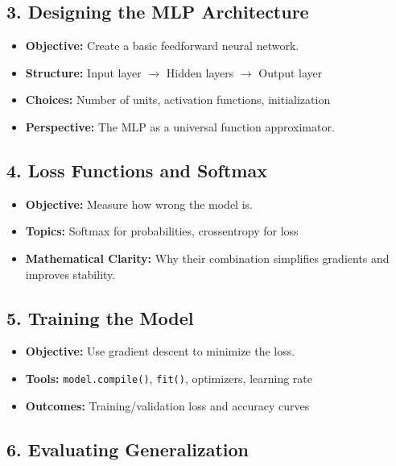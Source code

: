 \documentclass[11pt]{article}
\begin{document}
\subsection*{3. Designing the MLP Architecture}

\begin{itemize}
    \item \textbf{Objective:} Create a basic feedforward neural network.
    \item \textbf{Structure:} Input layer $\rightarrow$ Hidden layers $\rightarrow$ Output layer
    \item \textbf{Choices:} Number of units, activation functions, initialization
    \item \textbf{Perspective:} The MLP as a universal function approximator.
\end{itemize}

\subsection*{4. Loss Functions and Softmax}

\begin{itemize}
    \item \textbf{Objective:} Measure how wrong the model is.
    \item \textbf{Topics:} Softmax for probabilities, crossentropy for loss
    \item \textbf{Mathematical Clarity:} Why their combination simplifies gradients and improves stability.
\end{itemize}

\subsection*{5. Training the Model}

\begin{itemize}
    \item \textbf{Objective:} Use gradient descent to minimize the loss.
    \item \textbf{Tools:} \texttt{model.compile()}, \texttt{fit()}, optimizers, learning rate
    \item \textbf{Outcomes:} Training/validation loss and accuracy curves
\end{itemize}

\subsection*{6. Evaluating Generalization}
\end{document}
